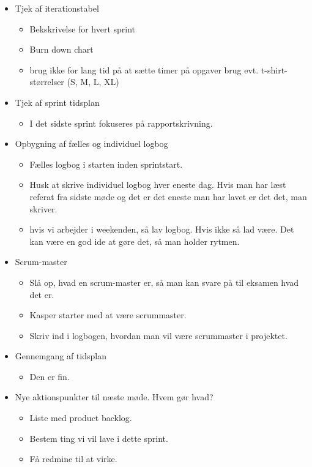 \documentclass{article}
\begin{document}
\begin{itemize}
\begin{itemize}
		\end{itemize}
	\item Tjek af iterationstabel
		\begin{itemize}
			\item Bekskrivelse for hvert sprint
			\item Burn down chart 
			\item brug ikke for lang tid på at sætte timer på opgaver 
			\subitem brug evt. t-shirt-størrelser (S, M, L, XL) 
		\end{itemize}
	\item Tjek af sprint tidsplan
		\begin{itemize}
			\item I det sidste sprint fokuseres på rapportskrivning. 
		\end{itemize}
	\item Opbygning af fælles og individuel logbog
		\begin{itemize}
			\item Fælles logbog i starten inden sprintstart. 
			\item Husk at skrive individuel logbog hver eneste dag. Hvis man har læst referat fra sidste møde og det er det eneste man har lavet er det det, man skriver. 
			\item hvis vi arbejder i weekenden, så lav logbog. Hvis ikke så lad være. Det kan være en god ide at gøre det, så man holder rytmen. 
		\end{itemize}
	\item Scrum-master 
		\begin{itemize}
			\item Slå op, hvad en scrum-master er, så man kan svare på til eksamen hvad det er. 
			\item Kasper starter med at være scrummaster. 
			\item Skriv ind i logbogen, hvordan man vil være scrummaster i projektet. 
		\end{itemize}
	\item Gennemgang af tidsplan 
		\begin{itemize}
			\item Den er fin. 
		\end{itemize}
	\item Nye aktionspunkter til næste møde. Hvem gør hvad? 
		\begin{itemize}
			\item Liste med product backlog. 
			\item Bestem ting vi vil lave i dette sprint. 
			\item Få redmine til at virke. 

\end{itemize}
\end{itemize}
\end{document}
